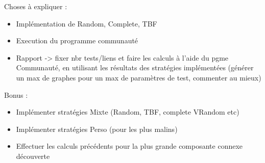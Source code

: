 \documentclass[a4paper]{sig-alternate}
\begin{document}

Choses à expliquer :

\begin{itemize}
\item Implémentation de Random, Complete, TBF
\item Execution du programme communauté
\item Rapport -> fixer nbr tests/liens et faire
les calculs à l'aide du pgme Communauté, en utilisant
les résultats des stratégies implémentées (générer un max de graphes pour
un max de paramètres de test, commenter au mieux)
\end{itemize}



Bonus :
\begin{itemize}
\item Implémenter stratégies Mixte (Random, TBF, complete  VRandom etc)
\item Implémenter stratégies Perso (pour les plus malins)
\item Effectuer les calculs précédents pour la plus grande composante connexe découverte
\end{itemize}



%




\end{document}
